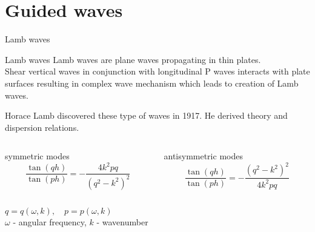 \documentclass[10pt,aspectratio=169,dvipsnames]{beamer} %
\begin{document}
\section{Guided waves}
\setcounter{subfigure}{0}
\begin{frame}{Lamb waves}
	\begin{alertblock}{Lamb waves}	
		Lamb waves are plane waves propagating in thin plates.\\
		Shear vertical waves in conjunction with longitudinal P waves interacts with plate surfaces resulting in complex wave mechanism which leads to creation of Lamb waves.
	\end{alertblock}
	Horace Lamb discovered these type of waves in 1917.
	He derived theory and dispersion relations.
	\begin{columns}[T]
		\begin{column}{0.5\textwidth}
			\centering
			symmetric modes
			\begin{equation*}
				\frac{\tan(q h)}{\tan(p h)} = -\frac{4 k^2 p q}{\left(q^2 - k^2\right)^2}
			\end{equation*}
		\end{column}
		\begin{column}{0.5\textwidth}
			\centering
			antisymmetric modes
			\begin{equation*}
				\frac{\tan(q h)}{\tan(p h)} = -\frac{\left(q^2 - k^2\right)^2}{4 k^2 p q}
			\end{equation*}
		\end{column}	
	\end{columns}	
	\vspace{5mm}
	\centering
	\(q=q(\omega,k), \quad p=p(\omega,k) \)\\
	\vspace{5mm}
	$\omega$ - angular frequency, $k$ - wavenumber
\end{frame}
\end{document}
